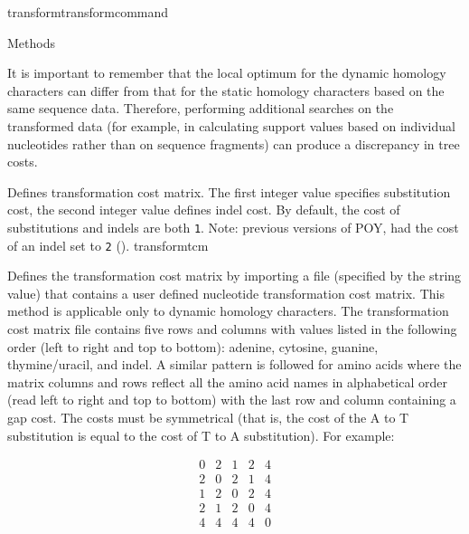 \begin{command}{transform}{transformcommand}
\begin{arguments}
\begin{argumentgroup}{Methods}
	\begin{statement}
  	  It is important to remember that the local optimum for the dynamic homology
	  characters can differ from that for the static homology characters based on the
	  same sequence data. Therefore, performing additional searches on the transformed
	  data (for example, in calculating support values based on individual nucleotides
	  rather than on sequence fragments) can produce a discrepancy in tree costs.
	\end{statement}

            {Defines transformation cost matrix. The first integer value specifies
            substitution cost, the second integer value defines indel cost. By default,
            the cost of substitutions and indels are both \texttt{1}.  Note: previous versions of POY, had
            the cost of an indel set to \texttt{2}
            ().}
            {transformtcm}

            {Defines the transformation cost matrix by importing a file (specified by
            the string value) that contains a user defined nucleotide
            transformation cost matrix. This method is applicable only to dynamic homology characters.
            The transformation cost matrix file contains five rows and columns
            with values listed in the following order (left to right and top to
            bottom): adenine, cytosine, guanine,
            thymine/uracil, and indel.  A similar pattern is followed for amino acids
            where the matrix columns and rows reflect all the amino acid names in alphabetical order
            (read left to right and top to bottom) with the last row and column containing a gap cost. 
            The costs must be symmetrical (that is, the
            cost of the A to T substitution is equal to the cost of T to A
            substitution). For example:

            \begin{equation*}
                \begin{array}{lllll}
                    0 &     2 &    1 &     2 &     4 \\
                    2 &     0 &    2 &     1 &     4 \\
                    1 &     2 &    0 &     2 &     4 \\
                    2 &     1 &    2 &     0 &     4 \\
                    4 &     4 &    4 &     4 &     0
                 \end{array}
            \end{equation*} 

}
\end{argumentgroup}
\end{arguments}
\end{command}
